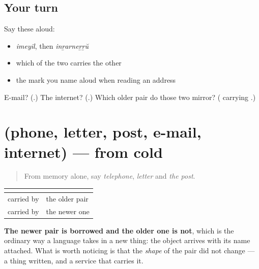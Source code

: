 \subsection*{Your turn}
Say these aloud:

\begin{itemize}
\raggedright
  \item \emph{imeyil}, then \emph{inṟarneṟṟŭ}
  \item which of the two carries the other
  \item the mark you name aloud when reading an address
\end{itemize}

\begin{tcolorbox}[breakable,colback=teal!4,colframe=teal!35!black,title={Before you move on}]
E-mail? (\textbf{}.) The internet? (\textbf{}.) Which older pair do those two mirror? (\textbf{} carrying \textbf{}.)
\end{tcolorbox}
\section[(phone, letter, post, e-mail, internet)]{(phone, letter, post, e-mail, internet) — from cold}

\label{lesson:ML-R110-message-recall}



\begin{quote}
From memory alone, say \emph{telephone}, \emph{letter} and \emph{the post}.
\end{quote}

\begin{grammarlens}[title={Grammar Lens: two ways of reaching somebody, a century apart}]
\noindent
\begin{tabularx}{\linewidth}{@{}>{\raggedright\arraybackslash}X>{\raggedright\arraybackslash}X@{}}
\toprule
\textbf{} & \textbf{} \\
\midrule
\textbf{\ml{കത്ത്}} carried by \textbf{\ml{തപാൽ}} & the older pair \\
\textbf{\ml{ഇമെയിൽ}} carried by \textbf{\ml{ഇന്റർനെറ്റ്}} & the newer one \\
\bottomrule
\end{tabularx}

\textbf{The newer pair is borrowed and the older one is not}, which is the ordinary way a language takes in a new thing: the object arrives with its name attached. What is worth noticing is that the \emph{shape} of the pair did not change — a thing written, and a service that carries it.
\end{grammarlens}

